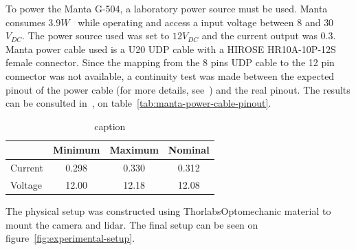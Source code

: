 To power the Manta G-504, a laboratory power source must be used. Manta consumes $3.9 W$~\cite{MantaG504C} while operating and access a input voltage between $8$ and $30$ $V_{DC}$. The power source used was set to  $12 V_{DC}$ and the current output was $0.3$. Manta power cable used is a U20 UDP cable with a HIROSE HR10A-10P-12S female connector. Since the mapping from the 8 pins \ac{UDP} cable to the 12 pin connector was not available, a continuity test was made between the expected pinout of the power cable (for more details, see~\cite{}) and the real pinout. The results can be consulted in~, on table~\ref{tab:manta-power-cable-pinout}.

	
\begin{table}[H]
	\centering
	\renewcommand{\arraystretch}{1.2}
	\begin{tabular}{lccc}
		\toprule
					  & Minimum & Maximum & Nominal \\ \midrule
		Current & 0.298 & 0.330 & 0.312 \\
		Voltage & 12.00 & 12.18 & 12.08 \\
		\bottomrule
	\end{tabular}
	\centering
	\label{tab:label}
	\caption{caption}
\end{table}

The physical setup was constructed using Thorlabs\cp Optomechanic material to mount the camera and \ac{lidar}. The final setup can be seen on figure~\ref{fig:experimental-setup}.

